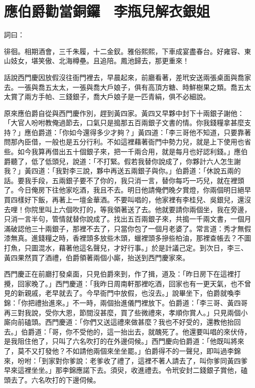 %

\chapter{應伯爵勸當銅鑼　李瓶兒解衣銀姐}

詞曰：

徘徊。相期酒會，三千朱履，十二金釵。雅俗熙熙，下車成宴盡春台。好雍容、東山妓女，堪笑傲、北海樽壘。且追陪。鳳池歸去，那更重來！

話說西門慶因放假沒往衙門裡去，早晨起來，前廳看著，差玳安送兩張桌面與喬家去。一張與喬五太太，一張與喬大戶娘子，俱有高頂方糖、時鮮樹果之類。喬五太太賞了兩方手帕、三錢銀子，喬大戶娘子是一匹青絹，俱不必細說。

原來應伯爵自從與西門慶作別，趕到黃四家。黃四又早夥中封下十兩銀子謝他：「大官人吩咐教俺過節去，口氣只是搗那五百兩銀子文書的情。你我錢糧拿甚麼支持？」應伯爵道：「你如今還得多少才夠？」黃四道：「李三哥他不知道，只要靠著問那內臣借，一般也是五分行利。不如這裡藉著衙門中勢力兒，就是上下使用也省些。如今我算再借出五十個銀子來，把一千兩合用，就是每月也好認利錢。」應伯爵聽了，低了低頭兒，說道：「不打緊。假若我替你說成了，你夥計六人怎生謝我？」黃四道：「我對李三說，夥中再送五兩銀子與你。」伯爵道：「休說五兩的話。要我手段，五兩銀子要不了你的，我只消一言，替你每巧一巧兒，就在裡頭了。今日俺房下往他家吃酒，我且不去。明日他請俺們晚夕賞燈，你兩個明日絕早買四樣好下飯，再著上一壇金華酒。不要叫唱的，他家裡有李桂兒、吳銀兒，還沒去哩！你院里叫上六個吹打的，等我領著送了去。他就要請你兩個坐，我在旁邊，只消一言半句，管情就替你說成了。找出五百兩銀子來，共搗一千兩文書，一個月滿破認他三十兩銀子，那裡不去了，只當你包了一個月老婆了。常言道：秀才無假漆無真。進錢糧之時，香裡頭多放些木頭，蠟裡頭多摻些柏油，那裡查帳去？不圖打魚，只圖混水，藉著他這名聲兒，才好行事。」於是計議己定。到次日，李三、黃四果然買了酒禮，伯爵領著兩個小廝，抬送到西門慶家來。

西門慶正在前廳打發桌面，只見伯爵來到，作了揖，道及：「昨日房下在這裡打攪，回家晚了。」西門慶道：「我昨日周南軒那裡吃酒，回家也有一更天氣，也不曾見的新親戚，老早就去了。今早衙門中放假，也沒去。」說畢坐下，伯爵就喚李錦：「你把禮抬進來。」不一時，兩個抬進儀門裡放下。伯爵道：「李三哥、黃四哥再三對我說，受你大恩，節間沒甚麼，買了些微禮來，孝順你賞人。」只見兩個小廝向前磕頭。西門慶道：「你們又送這禮來做甚麼？我也不好受的，還教他抬回去。」伯爵道：「哥，你不受他的，這一抬出去，就醜死了。他還要叫唱的來伏侍，是我阻住他了，只叫了六名吹打的在外邊伺候。」西門慶向伯爵道：「他既叫將來了，莫不又打發他？不如請他兩個來坐坐罷。」伯爵得不的一聲兒，即叫過李錦來，吩咐：「到家對你爹說：老爹收了禮了，這裡不著人請去了，叫你爹同黃四爹早來這裡坐坐。」那李錦應諾下去。須臾，收進禮去。令玳安封二錢銀子賞他，磕頭去了。六名吹打的下邊伺候。

